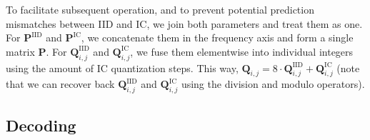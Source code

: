 \documentclass{article}
\newcommand{\ma}[1]{\textbf{#1}}
\begin{document}
To facilitate subsequent operation, and to prevent potential prediction mismatches between IID and IC, we join both parameters and treat them as one. For $\ma{P}^{\text{IID}}$ and $\ma{P}^{\text{IC}}$, we concatenate them in the frequency axis and form a single matrix $\ma{P}$. For $\ma{Q}^{\text{IID}}_{i,j}$ and $\ma{Q}^{\text{IC}}_{i,j}$, we fuse them elementwise into individual integers using the amount of IC quantization steps. This way, $\ma{Q}_{i,j}=8\cdot\ma{Q}^{\text{IID}}_{i,j}+\ma{Q}^{\text{IC}}_{i,j}$ (note that we can recover back $\ma{Q}^{\text{IID}}_{i,j}$ and $\ma{Q}^{\text{IC}}_{i,j}$ using the division and modulo operators). %

\subsection{Decoding}
\end{document}
